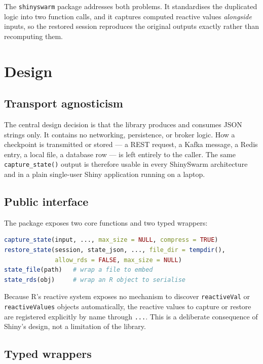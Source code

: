 \documentclass[11pt,a4paper]{article}
\begin{document}
The \texttt{shinyswarm} package addresses both problems. It standardises the
duplicated logic into two function calls, and it captures computed reactive
values \emph{alongside} inputs, so the restored session reproduces the original
outputs exactly rather than recomputing them.

\section{Design}

\subsection{Transport agnosticism}

The central design decision is that the library produces and consumes JSON
strings only. It contains no networking, persistence, or broker logic. How a
checkpoint is transmitted or stored --- a REST request, a Kafka message, a Redis
entry, a local file, a database row --- is left entirely to the caller. The same
\texttt{capture\_state()} output is therefore usable in every ShinySwarm
architecture and in a plain single-user Shiny application running on a laptop.

\subsection{Public interface}

The package exposes two core functions and two typed wrappers:

\begin{lstlisting}[language=R]
capture_state(input, ..., max_size = NULL, compress = TRUE)
restore_state(session, state_json, ..., file_dir = tempdir(),
              allow_rds = FALSE, max_size = NULL)
state_file(path)   # wrap a file to embed
state_rds(obj)     # wrap an R object to serialise
\end{lstlisting}

Because R's reactive system exposes no mechanism to discover
\texttt{reactiveVal} or \texttt{reactiveValues} objects automatically, the
reactive values to capture or restore are registered explicitly by name through
\texttt{...}. This is a deliberate consequence of Shiny's design, not a
limitation of the library.

\subsection{Typed wrappers}
\end{document}
